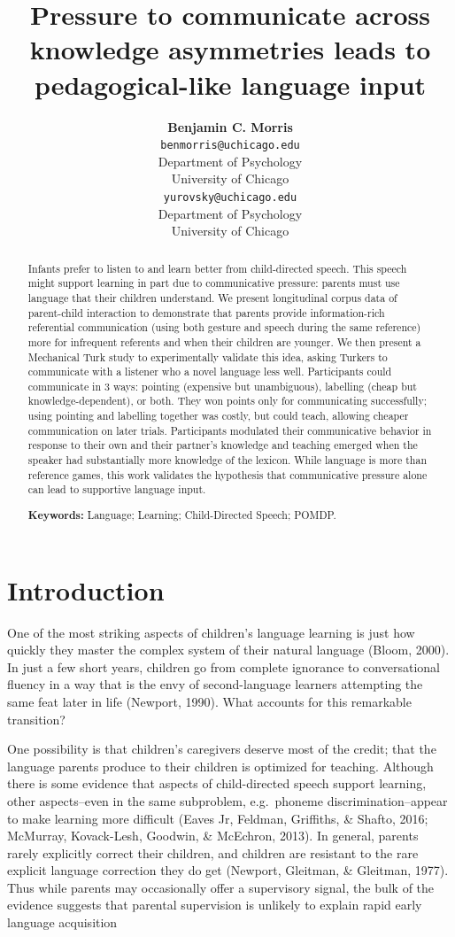 \documentclass[10pt, letterpaper]{article}
\title{Pressure to communicate across knowledge asymmetries leads to
pedagogical-like language input}
\author{{\large \bf Benjamin C. Morris} \\ \texttt{benmorris@uchicago.edu} \\ Department of Psychology \\ University of Chicago \And {\large \bf Daniel Yurovsky} \\ \texttt{yurovsky@uchicago.edu} \\ Department of Psychology \\ University of Chicago}
\begin{document}
\maketitle

\begin{abstract}
Infants prefer to listen to and learn better from child-directed speech.
This speech might support learning in part due to communicative
pressure: parents must use language that their children understand. We
present longitudinal corpus data of parent-child interaction to
demonstrate that parents provide information-rich referential
communication (using both gesture and speech during the same reference)
more for infrequent referents and when their children are younger. We
then present a Mechanical Turk study to experimentally validate this
idea, asking Turkers to communicate with a listener who a novel language
less well. Participants could communicate in 3 ways: pointing (expensive
but unambiguous), labelling (cheap but knowledge-dependent), or both.
They won points only for communicating successfully; using pointing and
labelling together was costly, but could teach, allowing cheaper
communication on later trials. Participants modulated their
communicative behavior in response to their own and their partner's
knowledge and teaching emerged when the speaker had substantially more
knowledge of the lexicon. While language is more than reference games,
this work validates the hypothesis that communicative pressure alone can
lead to supportive language input.

\textbf{Keywords:}
Language; Learning; Child-Directed Speech; POMDP.
\end{abstract}

\section{Introduction}\label{introduction}

One of the most striking aspects of children's language learning is just
how quickly they master the complex system of their natural language
(Bloom, 2000). In just a few short years, children go from complete
ignorance to conversational fluency in a way that is the envy of
second-language learners attempting the same feat later in life
(Newport, 1990). What accounts for this remarkable transition?

One possibility is that children's caregivers deserve most of the
credit; that the language parents produce to their children is optimized
for teaching. Although there is some evidence that aspects of
child-directed speech support learning, other aspects--even in the same
subproblem, e.g.~phoneme discrimination--appear to make learning more
difficult (Eaves Jr, Feldman, Griffiths, \& Shafto, 2016; McMurray,
Kovack-Lesh, Goodwin, \& McEchron, 2013). In general, parents rarely
explicitly correct their children, and children are resistant to the
rare explicit language correction they do get (Newport, Gleitman, \&
Gleitman, 1977). Thus while parents may occasionally offer a supervisory
signal, the bulk of the evidence suggests that parental supervision is
unlikely to explain rapid early language acquisition
\end{document}
